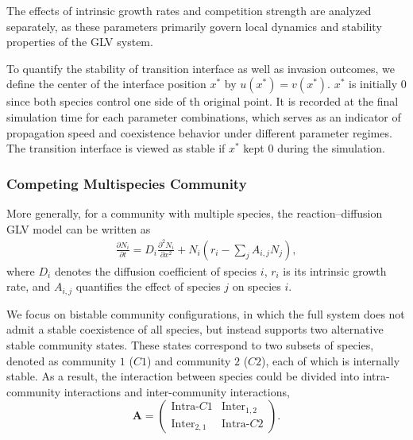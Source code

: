         The effects of intrinsic growth rates and competition strength are analyzed separately, as these parameters primarily govern local dynamics and stability properties of the GLV system. 

        To quantify the stability of transition interface as well as invasion outcomes, we define the center of the interface position $x^*$ by $u(x^*) = v(x^*)$. $x^*$ is initially $0$ since both species control one side of th original point. It is recorded at the final simulation time for each parameter combinations, which serves as an indicator of propagation speed and coexistence behavior under different parameter regimes. The transition interface is viewed as stable if $x^*$ kept $0$ during the simulation.

    \subsubsection{Competing Multispecies Community}

        More generally, for a community with multiple species, the reaction--diffusion GLV model can be written as
        \begin{equation}\label{eqn:multi_species}
            \begin{aligned}
                \frac{\partial N_i}{\partial t}
                = D_{i}\frac{\partial^2 N_i}{\partial x^2} 
                + N_i \left( r_i - \sum_{j} A_{i,j} N_j \right),
            \end{aligned}
        \end{equation}
        where $D_i$ denotes the diffusion coefficient of species $i$, $r_i$ is its intrinsic growth rate, and $A_{i,j}$ quantifies the effect of species $j$ on species $i$.

        We focus on bistable community configurations, in which the full system does not admit a stable coexistence of all species, but instead supports two alternative stable community states. These states correspond to two subsets of species, denoted as community $1$ ($C1$) and community $2$ ($C2$), each of which is internally stable. As a result, the interaction between species could be divided into intra-community interactions and inter-community interactions,        
        \begin{equation*}
            \mathbf{A} = \begin{pmatrix}
                \text{Intra-}C1 & \text{Inter}_{1,2}\\
                \text{Inter}_{2,1} & \text{Intra-}C2
            \end{pmatrix}.
        \end{equation*}


